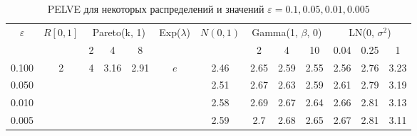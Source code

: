 \documentclass[12pt]{article}
\theoremstyle{plain}
\theoremstyle{definition}
\theoremstyle{remark}
\begin{document}
\begin{table}[ht]
\renewcommand{\arraystretch}{1.3}
\centering 
\begin{tabular}{|c|c|ccc|c|c|ccc|ccc|}
\hline
\multirow{2}{*}{$\varepsilon$} & \multirow{2}{*}{$R[0,1]$} & \multicolumn{3}{c|}{Pareto(k, 1)}                                                                            & \multirow{2}{*}{Exp($\lambda$)} & \multirow{2}{*}{$N(0,1)$} & \multicolumn{3}{c|}{Gamma(1, $\beta$, 0)}                    & \multicolumn{3}{c|}{LN(0, $\sigma^2$)}                       \\ \cline{3-5} \cline{8-13} 
                               &                                     & \multicolumn{1}{c|}{2}                  & \multicolumn{1}{c|}{4}                     & 8                     &                                 &                           & \multicolumn{1}{c|}{2}    & \multicolumn{1}{c|}{4}    & 10   & \multicolumn{1}{c|}{0.04} & \multicolumn{1}{c|}{0.25} & 1    \\ \hline
0.100                          & \multirow{4}{*}{2}                  & \multicolumn{1}{c|}{\multirow{4}{*}{4}} & \multicolumn{1}{c|}{\multirow{4}{*}{3.16}} & \multirow{4}{*}{2.91} & \multirow{4}{*}{$e$}            & 2.46                      & \multicolumn{1}{c|}{2.65} & \multicolumn{1}{c|}{2.59} & 2.55 & \multicolumn{1}{c|}{2.56} & \multicolumn{1}{c|}{2.76} & 3.23 \\ \cline{7-13} 
0.050                          &                                     & \multicolumn{1}{c|}{}                   & \multicolumn{1}{c|}{}                      &                       &                                 & 2.51                      & \multicolumn{1}{c|}{2.67} & \multicolumn{1}{c|}{2.63} & 2.59 & \multicolumn{1}{c|}{2.61} & \multicolumn{1}{c|}{2.79} & 3.19 \\ \cline{7-13} 
0.010                          &                                     & \multicolumn{1}{c|}{}                   & \multicolumn{1}{c|}{}                      &                       &                                 & 2.58                      & \multicolumn{1}{c|}{2.69} & \multicolumn{1}{c|}{2.67} & 2.64 & \multicolumn{1}{c|}{2.66} & \multicolumn{1}{c|}{2.81} & 3.13 \\ \cline{7-13} 
0.005                          &                                     & \multicolumn{1}{c|}{}                   & \multicolumn{1}{c|}{}                      &                       &                                 & 2.59                      & \multicolumn{1}{c|}{2.7}  & \multicolumn{1}{c|}{2.68} & 2.65 & \multicolumn{1}{c|}{2.67} & \multicolumn{1}{c|}{2.81} & 3.11 \\ \hline
\end{tabular}
\caption{PELVE для некоторых распределений и значений $\varepsilon = 0.1, 0.05, 0.01, 0.005$} 
\end{table}
\end{document}
